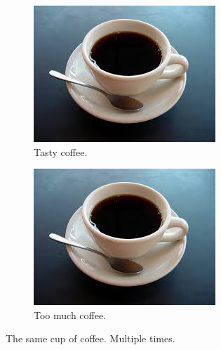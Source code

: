 \documentclass{article}
\begin{document}
\begin{figure}[h!]
\begin{subfigure}[b]{0.2\linewidth}
    \includegraphics[width=\linewidth]{coffee.jpg}
    \caption{Tasty coffee.}
  \end{subfigure}
  \begin{subfigure}[b]{0.5\linewidth}
    \includegraphics[width=\linewidth]{coffee.jpg}
    \caption{Too much coffee.}
  \end{subfigure}
  \caption{The same cup of coffee. Multiple times.}
  \label{fig:coffee3}
\end{figure}
\end{document}
